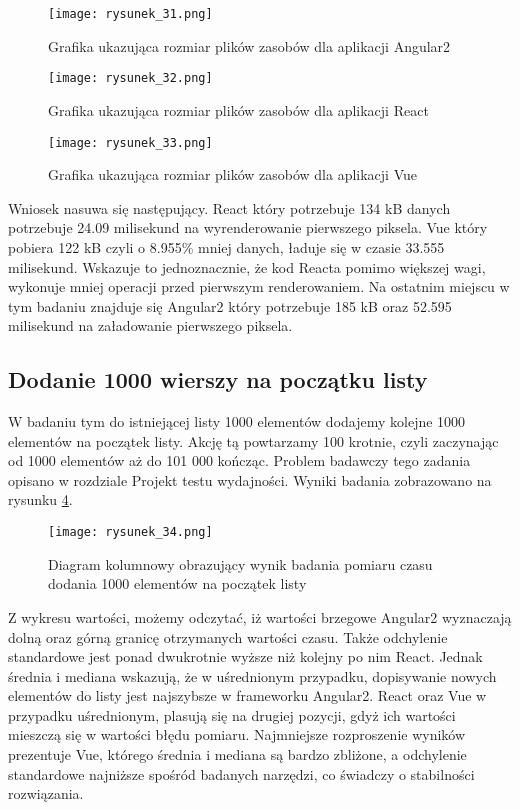 \begin{figure}[!ht]
    \centering
    \texttt{[image: rysunek\_31.png]}
    \caption{Grafika ukazująca rozmiar plików zasobów dla aplikacji Angular2}
    \label{fig:rysunek_31}
\end{figure}

\begin{figure}[!ht]
    \centering
    \texttt{[image: rysunek\_32.png]}
    \caption{Grafika ukazująca rozmiar plików zasobów dla aplikacji React}
    \label{fig:rysunek_32}
\end{figure}

\begin{figure}[!ht]
    \centering
    \texttt{[image: rysunek\_33.png]}
    \caption{Grafika ukazująca rozmiar plików zasobów dla aplikacji Vue}
    \label{fig:rysunek_33}
\end{figure}

Wniosek nasuwa się następujący. React który potrzebuje 134 kB danych potrzebuje 24.09 milisekund na wyrenderowanie pierwszego piksela.
Vue który pobiera 122 kB czyli o 8.955\% mniej danych, ładuje się w czasie 33.555 milisekund.
Wskazuje to jednoznacznie, że kod Reacta pomimo większej wagi, wykonuje mniej operacji przed pierwszym renderowaniem.
Na ostatnim miejscu w tym badaniu znajduje się Angular2 który potrzebuje 185 kB oraz 52.595 milisekund na załadowanie pierwszego piksela.

\subsection{Dodanie 1000 wierszy na początku listy}

W badaniu tym do istniejącej listy 1000 elementów dodajemy kolejne 1000 elementów na początek listy.
Akcję tą powtarzamy 100 krotnie, czyli zaczynając od 1000 elementów aż do 101 000 kończąc.
Problem badawczy tego zadania opisano w rozdziale Projekt testu wydajności.
Wyniki badania zobrazowano na rysunku \ref{fig:rysunek_34}.

\begin{figure}[!ht]
    \centering
    \texttt{[image: rysunek\_34.png]}
    \caption{Diagram kolumnowy obrazujący wynik badania pomiaru czasu dodania 1000 elementów na początek listy}
    \label{fig:rysunek_34}
\end{figure}

Z wykresu wartości, możemy odczytać, iż wartości brzegowe Angular2 wyznaczają dolną oraz górną granicę otrzymanych wartości czasu.
Także odchylenie standardowe jest ponad dwukrotnie wyższe niż kolejny po nim React.
Jednak średnia i mediana wskazują, że w uśrednionym przypadku, dopisywanie nowych elementów do listy jest najszybsze w frameworku Angular2.
React oraz Vue w przypadku uśrednionym, plasują się na drugiej pozycji, gdyż ich wartości mieszczą się w wartości błędu pomiaru.
Najmniejsze rozproszenie wyników prezentuje Vue, którego średnia i mediana są bardzo zbliżone,
a odchylenie standardowe najniższe spośród badanych narzędzi, co świadczy o stabilności rozwiązania.


